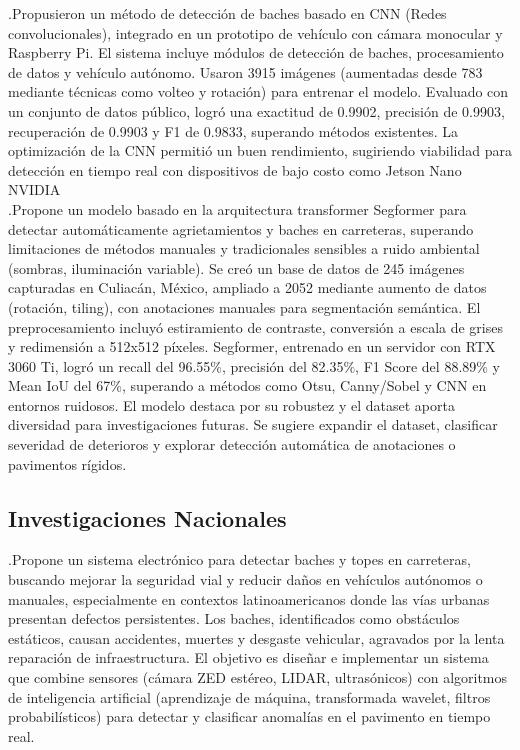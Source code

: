 \noindent \textcite{TC2021maji} .Propusieron un método de detección de baches basado en CNN (Redes convolucionales), integrado en un prototipo de vehículo con cámara monocular y Raspberry Pi. El sistema incluye módulos de detección de baches, procesamiento de datos y vehículo autónomo. Usaron 3915 imágenes (aumentadas desde 783 mediante técnicas como volteo y rotación) para entrenar el modelo. Evaluado con un conjunto de datos público, logró una exactitud de 0.9902, precisión de 0.9903, recuperación de 0.9903 y F1 de 0.9833, superando métodos existentes. La optimización de la CNN permitió un buen rendimiento, sugiriendo viabilidad para detección en tiempo real con dispositivos de bajo costo como Jetson Nano NVIDIA\\

\noindent \textcite{TC2024mario} .Propone un modelo basado en la arquitectura transformer Segformer para detectar automáticamente agrietamientos y baches en carreteras, superando limitaciones de métodos manuales y tradicionales sensibles a ruido ambiental (sombras, iluminación variable). Se creó un base de datos de 245 imágenes capturadas en Culiacán, México, ampliado a 2052 mediante aumento de datos (rotación, tiling), con anotaciones manuales para segmentación semántica. El preprocesamiento incluyó estiramiento de contraste, conversión a escala de grises y redimensión a 512x512 píxeles. Segformer, entrenado en un servidor con RTX 3060 Ti, logró un recall del 96.55$\%$, precisión del 82.35$\%$, F1 Score del 88.89$\%$ y Mean IoU del 67$\%$, superando a métodos como Otsu, Canny/Sobel y CNN en entornos ruidosos. El modelo destaca por su robustez y el dataset aporta diversidad para investigaciones futuras. Se sugiere expandir el dataset, clasificar severidad de deterioros y explorar detección automática de anotaciones o pavimentos rígidos.\\


\subsection{Investigaciones Nacionales}


\noindent \textcite{TC2021pedro} .Propone un sistema electrónico para detectar baches y topes en carreteras, buscando mejorar la seguridad vial y reducir daños en vehículos autónomos o manuales, especialmente en contextos latinoamericanos donde las vías urbanas presentan defectos persistentes. Los baches, identificados como obstáculos estáticos, causan accidentes, muertes y desgaste vehicular, agravados por la lenta reparación de infraestructura. El objetivo es diseñar e implementar un sistema que combine sensores (cámara ZED estéreo, LIDAR, ultrasónicos) con algoritmos de inteligencia artificial (aprendizaje de máquina, transformada wavelet, filtros probabilísticos) para detectar y clasificar anomalías en el pavimento en tiempo real.\\

